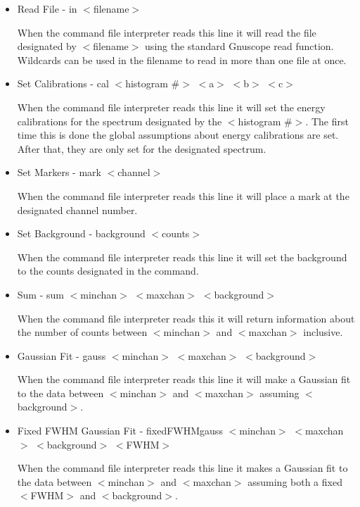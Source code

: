 \begin{itemize}

\item{Read File - in $<$filename$>$}

When the command file interpreter reads this line it will read the file designated by $<$filename$>$ using the standard Gnuscope read function.  Wildcards can be used in the filename to read in more than one file at once.

\item{Set Calibrations - cal $<$histogram \#$>$ $<$a$>$ $<$b$>$ $<$c$>$}

When the command file interpreter reads this line it will set the energy calibrations for the spectrum designated by the $<$histogram \#$>$.  The first time this is done the global assumptions about energy calibrations are set.  After that, they are only set for the designated spectrum.

\item{Set Markers - mark $<$channel$>$}

When the command file interpreter reads this line it will place a mark at the designated channel number.

\item{Set Background - background $<$counts$>$}

When the command file interpreter reads this line it will set the background to the counts designated in the command.

\item{Sum - sum $<$minchan$>$ $<$maxchan$>$ $<$background$>$}

When the command file interpreter reads this it will return information about the number of counts between $<$minchan$>$ and $<$maxchan$>$ inclusive.

\item{Gaussian Fit - gauss $<$minchan$>$ $<$maxchan$>$ $<$background$>$}

When the command file interpreter reads this line it will make a Gaussian fit to the data between $<$minchan$>$ and $<$maxchan$>$ assuming $<$background$>$.

\item{Fixed FWHM Gaussian Fit - fixedFWHMgauss $<$minchan$>$ $<$maxchan$>$ $<$background$>$ $<$FWHM$>$}

When the command file interpreter reads this line it makes a Gaussian fit to the data between $<$minchan$>$ and $<$maxchan$>$ assuming both a fixed $<$FWHM$>$ and $<$background$>$.


\end{itemize}
